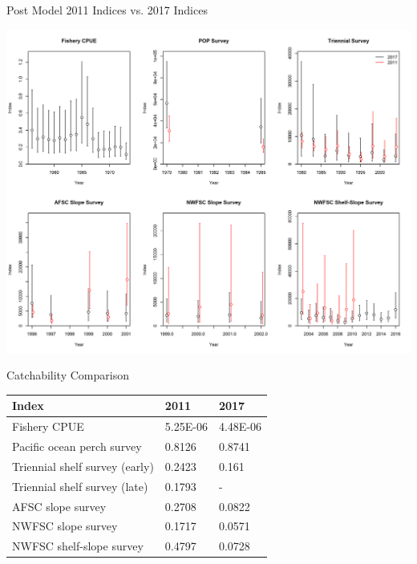 \documentclass[pdf]{beamer}\usepackage[]{graphicx}\usepackage[]{color}
\begin{document}
\begin{frame}{Post Model 2011 Indices vs. 2017 Indices}
  \begin{center}
    \includegraphics[scale = 0.35]{figures/Index_Compare_PostModel_2011_2017.png}
  \end{center}
\end{frame} 

\begin{frame}{Catchability Comparison}
  \begin{table}[ht]
  \centering
  \begin{tabular}{p{2in}p{0.7in}p{0.7in}}
  Index & 2011 & 2017 \\ 
  \hline
  Fishery CPUE & 5.25E-06 & 4.48E-06 \\ 
  Pacific ocean perch survey & 0.8126 & 0.8741 \\
  Triennial shelf survey (early)& 0.2423 & 0.161 \\ 
  Triennial shelf survey (late) & 0.1793 & - \\
  AFSC slope survey & 0.2708 & 0.0822 \\ 
  NWFSC slope survey & 0.1717 & 0.0571 \\
  NWFSC shelf-slope survey & 0.4797 & 0.0728 \\
  \hline
  \end{tabular}
  \end{table}
\end{frame}
\end{document}

